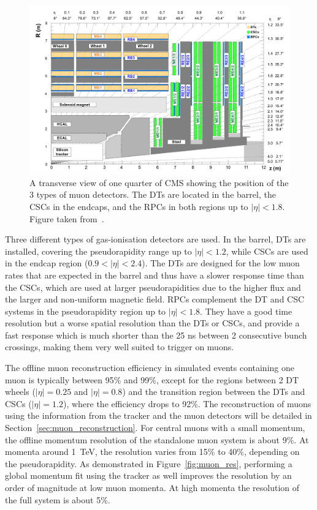 \begin{figure}[ht]
  \centering
 \includegraphics[width=.95\textwidth]{muon_system_new}
 \caption{A transverse view of one quarter of \ac{CMS} showing the position of the 3 types of muon detectors. The \protect\acfp{DT} are located in the barrel, the \protect\acfp{CSC} in the endcaps, and the \protect\acfp{RPC} in both regions up to $|\eta| < 1.8$. Figure taken from~\cite{Abbiendi:2015txa}.}
 \label{fig:muons}
\end{figure}

Three different types of gas-ionisation detectors are used. In the barrel, \acp{DT} are installed, covering the pseudorapidity range up to $|\eta| < 1.2$, while \acp{CSC} are used in the endcap region ($0.9 < |\eta| < 2.4$). The \acp{DT} are designed for the low muon rates that are expected in the barrel and thus have a slower response time than the \acp{CSC}, which are used at larger pseudorapidities due to the higher flux and the larger and non-uniform magnetic field. \acp{RPC} complement the \ac{DT} and \ac{CSC} systems in the pseudorapidity region up to $|\eta| < 1.8$. They have a good time resolution but a worse spatial resolution than the \acp{DT} or \acp{CSC}, and provide a fast response which is much shorter than the 25 ns between 2 consecutive bunch crossings, making them very well suited to trigger on muons.

The offline muon reconstruction efficiency in simulated events containing one muon is typically between 95\% and 99\%, except for the regions between 2 \ac{DT} wheels ($|\eta| = 0.25$ and $|\eta| = 0.8$) and the transition region between the \acp{DT} and \acp{CSC} ($|\eta| = 1.2$), where the efficiency drops to 92\%. The reconstruction of muons using the information from the tracker and the muon detectors will be detailed in Section~\ref{sec:muon_reconstruction}. For central muons with a small momentum, the offline momentum resolution of the standalone muon system is about 9\%. At momenta around \SI{1}{TeV}, the resolution varies from 15\% to 40\%, depending on the pseudorapidity. As demonstrated in Figure~\ref{fig:muon_res}, performing a global momentum fit using the tracker as well improves the resolution by an order of magnitude at low muon momenta. At high momenta the resolution of the full system is about 5\%.

